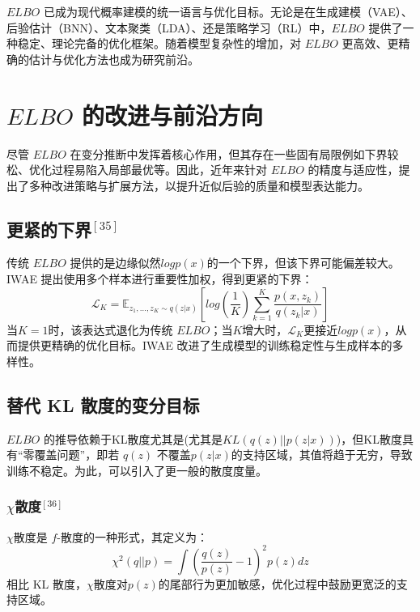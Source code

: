 \documentclass[final]{ws-ijseke}
\begin{document}
\hspace*{2em}$ELBO$ 已成为现代概率建模的统一语言与优化目标。无论是在生成建模（VAE）、后验估计（BNN）、文本聚类（LDA）、还是策略学习（RL）中，$ELBO$ 提供了一种稳定、理论完备的优化框架。随着模型复杂性的增加，对 $ELBO$ 更高效、更精确的估计与优化方法也成为研究前沿。

\section{$ELBO$ 的改进与前沿方向}
\hspace*{2em}尽管 $ELBO$ 在变分推断中发挥着核心作用，但其存在一些固有局限例如下界较松、优化过程易陷入局部最优等。因此，近年来针对 $ELBO$ 的精度与适应性，提出了多种改进策略与扩展方法，以提升近似后验的质量和模型表达能力。
\subsection{更紧的下界$^{[35]}$}
\hspace*{2em}传统 $ELBO$ 提供的是边缘似然$logp(x)$的一个下界，但该下界可能偏差较大。IWAE 提出使用多个样本进行重要性加权，得到更紧的下界：
\begin{equation*}
\mathcal{L}_K = \mathbb{E}_{z_1,\dots,z_K\sim q(z|x)}[log(\frac{1}{K})\sum_{k=1}^K\frac{p(x,z_k)}{q(z_k|x)}]
\end{equation*}
\hspace*{2em}当$K=1$时，该表达式退化为传统 $ELBO$；当$K$增大时，$\mathcal{L}_K$更接近$logp(x)$，从而提供更精确的优化目标。IWAE 改进了生成模型的训练稳定性与生成样本的多样性。
\subsection{替代 KL 散度的变分目标}
\hspace*{2em}$ELBO$ 的推导依赖于KL散度尤其是(尤其是$KL(q(z)||p(z|x))$)，但KL散度具有“零覆盖问题”，即若
$q(z)$ 不覆盖$p(z|x) $的支持区域，其值将趋于无穷，导致训练不稳定。为此，可以引入了更一般的散度度量。\\
\subsubsection{$\chi$散度$^{[36]}$}
$\chi$散度是 $f$-散度的一种形式，其定义为：
\begin{equation*}
\chi^2(q||p) = \int(\frac{q(z)}{p(z)}-1)^2p(z)dz
\end{equation*}
相比 KL 散度，$\chi$散度对$p(z)$的尾部行为更加敏感，优化过程中鼓励更宽泛的支持区域。
\end{document}
